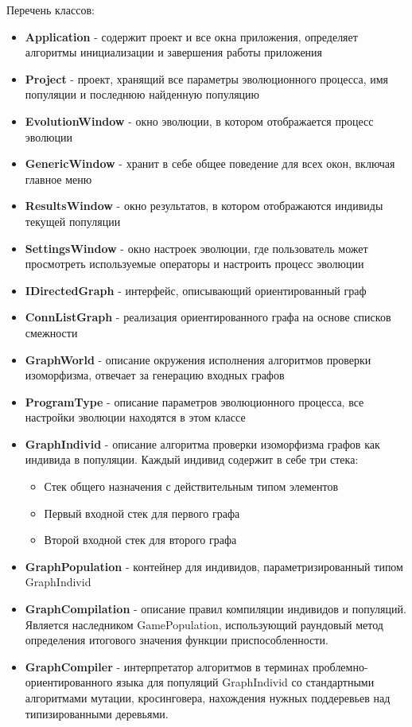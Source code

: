 \documentclass[russian,utf8,emptystyle]{eskdtext}
\begin{document}
\begin{spacing}{1.5}
Перечень классов:
\begin{itemize}
\item \textbf{Application} - содержит проект и все окна приложения, определяет алгоритмы инициализации и завершения работы приложения
\item \textbf{Project} - проект, хранящий все параметры эволюционного процесса, имя популяции и последнюю найденную популяцию
\item \textbf{EvolutionWindow} - окно эволюции, в котором отображается процесс эволюции
\item \textbf{GenericWindow} - хранит в себе общее поведение для всех окон, включая главное меню
\item \textbf{ResultsWindow} - окно результатов, в котором отображаются индивиды текущей популяции
\item \textbf{SettingsWindow} - окно настроек эволюции, где пользователь может просмотреть используемые операторы и настроить процесс эволюции
\item \textbf{IDirectedGraph} - интерфейс, описывающий ориентированный граф
\item \textbf{ConnListGraph} - реализация ориентированного графа на основе списков смежности
\item \textbf{GraphWorld} - описание окружения исполнения алгоритмов проверки изоморфизма, отвечает за генерацию входных графов
\item \textbf{ProgramType} - описание параметров эволюционного процесса, все настройки эволюции находятся в этом классе
\item \textbf{GraphIndivid} - описание алгоритма проверки изоморфизма графов как индивида в популяции. Каждый индивид содержит в себе три стека:
\begin{itemize}
\item Стек общего назначения с действительным типом элементов
\item Первый входной стек для первого графа
\item Второй входной стек для второго графа
\end{itemize}
\item \textbf{GraphPopulation} - контейнер для индивидов, параметризированный типом GraphIndivid
\item \textbf{GraphCompilation} - описание правил компиляции индивидов и популяций. Является наследником GamePopulation, использующий раундовый метод определения итогового значения функции приспособленности.
\item \textbf{GraphCompiler} - интерпретатор алгоритмов в терминах проблемно-ориентированного языка для популяций GraphIndivid со стандартными алгоритмами мутации, кросинговера, нахождения нужных поддеревьев над типизированными деревьями.

\end{itemize}
\end{spacing}
\end{document}
